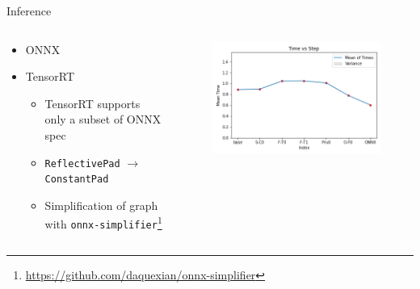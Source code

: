 \documentclass[en]{sdqbeamer}
\begin{document}
\begin{frame}{Inference}
  \begin{columns}
    \begin{column}{0.4\textwidth}
      \begin{itemize}
        \item ONNX
        \item TensorRT
        \begin{itemize}
          \item TensorRT supports only a subset of ONNX spec
          \item \texttt{ReflectivePad} $\rightarrow{}$ \texttt{ConstantPad}
          \item Simplification of graph with \texttt{onnx-simplifier}\footnote{\url{https://github.com/daquexian/onnx-simplifier}}
        \end{itemize}
      \end{itemize}
    \end{column}
    \begin{column}{0.6\textwidth}
      \begin{figure}
        \includegraphics[scale=0.5]{time_against_step}
      \end{figure}
    \end{column}
  \end{columns}
\end{frame}
\end{document}
